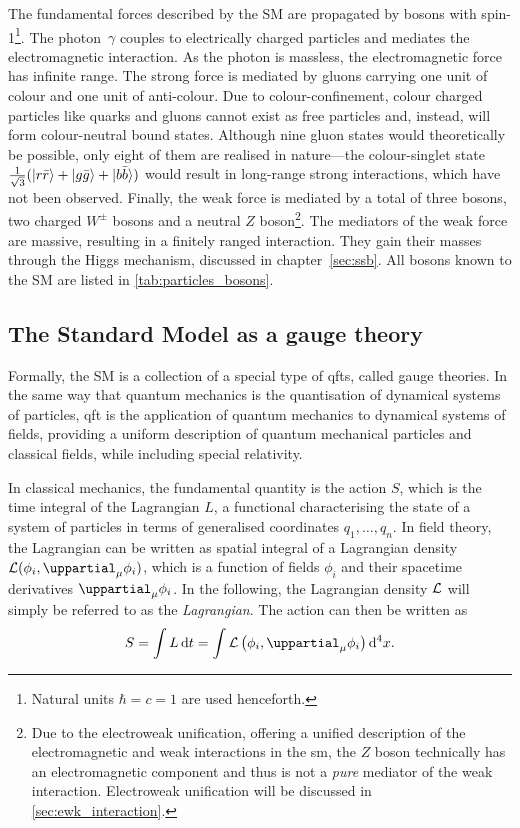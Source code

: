The fundamental forces described by the SM are propagated by bosons with spin-1\footnote{Natural units $\hbar = c = 1$ are used henceforth.}.
The photon~$\gamma$ couples to electrically charged particles and mediates the electromagnetic interaction.
As the photon is massless, the electromagnetic force has infinite range.
The strong force is mediated by gluons carrying one unit of colour and one unit of anti-colour.
Due to colour-confinement, colour charged particles like quarks and gluons cannot exist as free particles and, instead, will form colour-neutral bound states.
Although nine gluon states would theoretically be possible, only eight of them are realised in nature---the colour-singlet state $\frac{1}{\sqrt{3}}(\ket{r\bar{r}}+\ket{g\bar{g}}+\ket{b\bar{b}})$ would result in long-range strong interactions, which have not been observed.
Finally, the weak force is mediated by a total of three bosons, two charged $W^\pm$ bosons and a neutral $Z$ boson\footnote{Due to the electroweak unification, offering a unified description of the electromagnetic and weak interactions in the \gls{sm}, the $Z$ boson technically has an electromagnetic component and thus is not a \textit{pure} mediator of the weak interaction. Electroweak unification will be discussed in \cref{sec:ewk_interaction}.}.
The mediators of the weak force are massive, resulting in a finitely ranged interaction. They gain their masses through the Higgs mechanism, discussed in chapter~\cref{sec:ssb}. All bosons known to the SM are listed in \cref{tab:particles_bosons}.

\subsection{The Standard Model as a gauge theory}\label{ch:gauge_theory}

Formally, the SM is a collection of a special type of \glspl{qft}, called gauge theories. In the same way that quantum mechanics is the quantisation of dynamical systems of particles, \gls{qft} is the application of quantum mechanics to dynamical systems of fields, providing a uniform description of quantum mechanical particles and classical fields, while including special relativity.

In classical mechanics, the fundamental quantity  is the action $S$, which is the time integral of the Lagrangian $L$, a functional characterising the state of a system of particles in terms of generalised coordinates $q_1, \dots, q_n$. In field theory, the Lagrangian can be written as spatial integral of a Lagrangian density $\Lagr(\phi_i,\uppartial_\mu\phi_i)$, which is a function of fields $\phi_i$ and their spacetime derivatives $\uppartial_\mu\phi_i$. In the following, the Lagrangian density $\mathcal{L}$ will simply be referred to as the \textit{Lagrangian}. The action can then be written as
\begin{equation}
	S = \int L\diff t = \int\Lagr\left(\phi_i,\uppartial_\mu\phi_i\right)\Diff4 x.
\end{equation}

